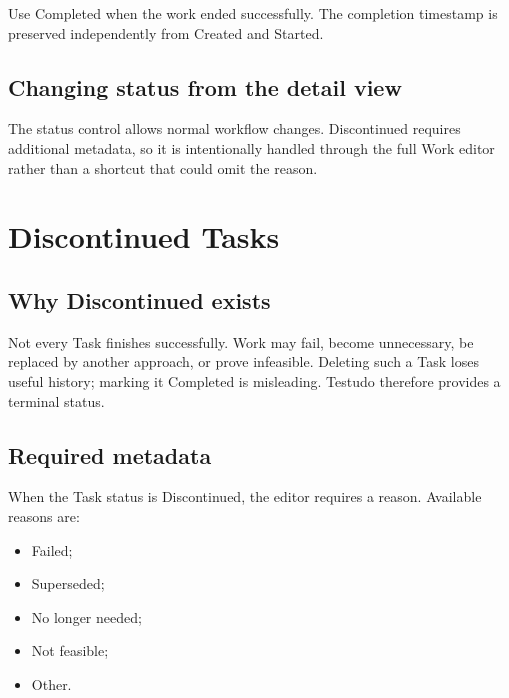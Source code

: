 \documentclass{testudomanual}
\begin{document}
Use Completed when the work ended successfully. The completion timestamp is preserved independently from Created and Started.

\section{Changing status from the detail view}

The status control allows normal workflow changes. Discontinued requires additional metadata, so it is intentionally handled through the full Work editor rather than a shortcut that could omit the reason.


\chapter{Discontinued Tasks}

\section{Why Discontinued exists}

Not every Task finishes successfully. Work may fail, become unnecessary, be replaced by another approach, or prove infeasible. Deleting such a Task loses useful history; marking it Completed is misleading. Testudo therefore provides a terminal  status.

\section{Required metadata}

When the Task status is Discontinued, the editor requires a reason. Available reasons are:
\begin{itemize}
    \item Failed;
    \item Superseded;
    \item No longer needed;
    \item Not feasible;
    \item Other.
\end{itemize}
\end{document}
